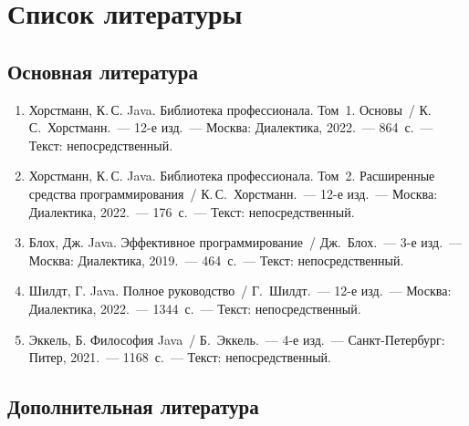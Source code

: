 \chapter*{Список литературы}

\section*{Основная литература}

\begin{enumerate}[leftmargin=*,labelsep=6pt]

\item Хорстманн, К.\,С. Java. Библиотека профессионала. Том~1. Основы~/
К.\,С.~Хорстманн.~--- 12-е изд.~--- Москва: Диалектика, 2022.~--- 864~с.~---
Текст: непосредственный.

\item Хорстманн, К.\,С. Java. Библиотека профессионала. Том~2. Расширенные
средства программирования~/ К.\,С.~Хорстманн.~--- 12-е изд.~--- Москва:
Диалектика, 2022.~--- 176~с.~--- Текст: непосредственный.

\item Блох, Дж. Java. Эффективное программирование~/ Дж.~Блох.~--- 3-е изд.~---
Москва: Диалектика, 2019.~--- 464~с.~--- Текст: непосредственный.

\item Шилдт, Г. Java. Полное руководство~/ Г.~Шилдт.~--- 12-е изд.~--- Москва:
Диалектика, 2022.~--- 1344~с.~--- Текст: непосредственный.

\item Эккель, Б. Философия Java~/ Б.~Эккель.~--- 4-е изд.~--- Санкт-Петербург:
Питер, 2021.~--- 1168~с.~--- Текст: непосредственный.

\end{enumerate}

\section*{Дополнительная литература}


